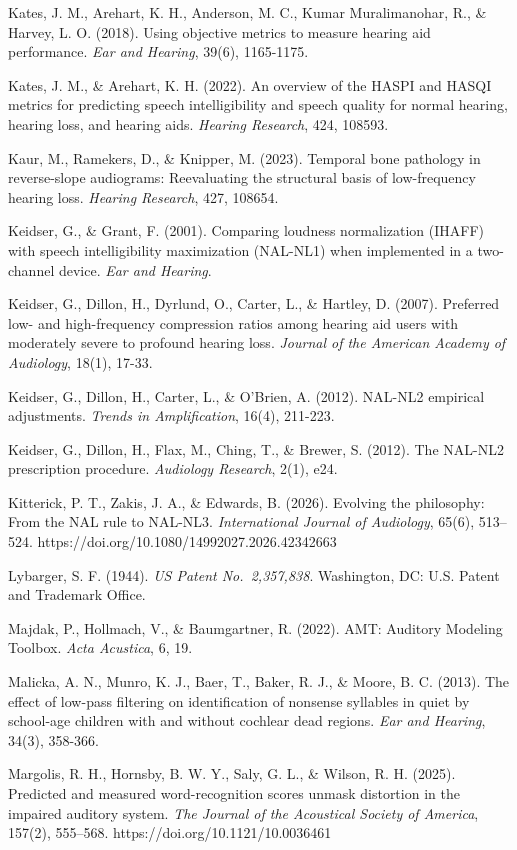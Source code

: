 \documentclass[
  12pt,
]{article}
\begin{document}
Kates, J. M., Arehart, K. H., Anderson, M. C., Kumar Muralimanohar, R.,
\& Harvey, L. O. (2018). Using objective metrics to measure hearing aid
performance. \emph{Ear and Hearing}, 39(6), 1165-1175.

Kates, J. M., \& Arehart, K. H. (2022). An overview of the HASPI and
HASQI metrics for predicting speech intelligibility and speech quality
for normal hearing, hearing loss, and hearing aids. \emph{Hearing
Research}, 424, 108593.

Kaur, M., Ramekers, D., \& Knipper, M. (2023). Temporal bone pathology
in reverse-slope audiograms: Reevaluating the structural basis of
low-frequency hearing loss. \emph{Hearing Research}, 427, 108654.

Keidser, G., \& Grant, F. (2001). Comparing loudness normalization
(IHAFF) with speech intelligibility maximization (NAL-NL1) when
implemented in a two-channel device. \emph{Ear and Hearing}.

Keidser, G., Dillon, H., Dyrlund, O., Carter, L., \& Hartley, D. (2007).
Preferred low- and high-frequency compression ratios among hearing aid
users with moderately severe to profound hearing loss. \emph{Journal of
the American Academy of Audiology}, 18(1), 17-33.

Keidser, G., Dillon, H., Carter, L., \& O'Brien, A. (2012). NAL-NL2
empirical adjustments. \emph{Trends in Amplification}, 16(4), 211-223.

Keidser, G., Dillon, H., Flax, M., Ching, T., \& Brewer, S. (2012). The
NAL-NL2 prescription procedure. \emph{Audiology Research}, 2(1), e24.

Kitterick, P. T., Zakis, J. A., \& Edwards, B. (2026). Evolving the
philosophy: From the NAL rule to NAL-NL3. \emph{International Journal of
Audiology}, 65(6), 513--524.
https://doi.org/10.1080/14992027.2026.42342663

Lybarger, S. F. (1944). \emph{US Patent No.~2,357,838}. Washington, DC:
U.S. Patent and Trademark Office.

Majdak, P., Hollmach, V., \& Baumgartner, R. (2022). AMT: Auditory
Modeling Toolbox. \emph{Acta Acustica}, 6, 19.

Malicka, A. N., Munro, K. J., Baer, T., Baker, R. J., \& Moore, B. C.
(2013). The effect of low-pass filtering on identification of nonsense
syllables in quiet by school-age children with and without cochlear dead
regions. \emph{Ear and Hearing}, 34(3), 358-366.

Margolis, R. H., Hornsby, B. W. Y., Saly, G. L., \& Wilson, R. H.
(2025). Predicted and measured word-recognition scores unmask distortion
in the impaired auditory system. \emph{The Journal of the Acoustical
Society of America}, 157(2), 555--568.
https://doi.org/10.1121/10.0036461
\end{document}
